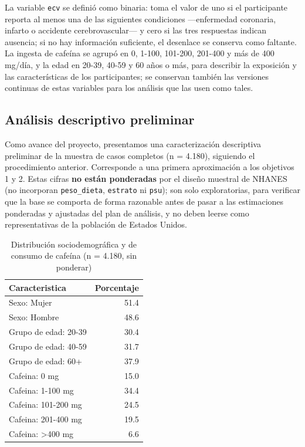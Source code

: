 \documentclass[
  spanish,
  12pt,
]{article}
\begin{document}
La variable \texttt{ecv} se definió como binaria: toma el valor de uno si el
participante reporta al menos una de las siguientes condiciones
---enfermedad coronaria, infarto o accidente cerebrovascular--- y cero si
las tres respuestas indican ausencia; si no hay información suficiente,
el desenlace se conserva como faltante. La ingesta de cafeína se
agrupó en 0, 1-100, 101-200, 201-400 y más de 400 mg/día, y la edad en
20-39, 40-59 y 60 años o más, para describir la exposición y las
características de los participantes; se conservan también las
versiones continuas de estas variables para los análisis que las usen
como tales.

\subsection{Análisis descriptivo preliminar}\label{anuxe1lisis-descriptivo-preliminar}

Como avance del proyecto, presentamos una caracterización descriptiva
preliminar de la muestra de casos completos (n = 4.180), siguiendo el
procedimiento anterior. Corresponde a una primera aproximación a los
objetivos 1 y 2. Estas cifras \textbf{no están ponderadas} por el diseño
muestral de NHANES (no incorporan \texttt{peso\_dieta}, \texttt{estrato} ni \texttt{psu});
son solo exploratorias, para verificar que la base se comporta de
forma razonable antes de pasar a las estimaciones ponderadas y
ajustadas del plan de análisis, y no deben leerse como representativas
de la población de Estados Unidos.

\begin{table}

\caption{\label{tab:avance-tabla1}Distribución sociodemográfica y de consumo de cafeína (n = 4.180, sin ponderar)}
\centering
\begin{tabular}[t]{l|r}
\hline
Caracteristica & Porcentaje\\
\hline
Sexo: Mujer & 51.4\\
\hline
Sexo: Hombre & 48.6\\
\hline
Grupo de edad: 20-39 & 30.4\\
\hline
Grupo de edad: 40-59 & 31.7\\
\hline
Grupo de edad: 60+ & 37.9\\
\hline
Cafeina: 0 mg & 15.0\\
\hline
Cafeina: 1-100 mg & 34.4\\
\hline
Cafeina: 101-200 mg & 24.5\\
\hline
Cafeina: 201-400 mg & 19.5\\
\hline
Cafeina: >400 mg & 6.6\\
\hline
\end{tabular}
\end{table}
\end{document}
